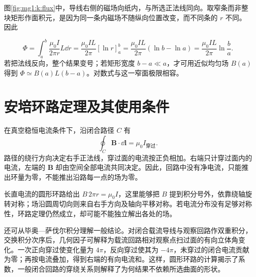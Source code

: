 图\ref{fig:mg1:k:flux}中，导线右侧的磁场向纸内，与所选正法线同向。取窄条而非整块矩形作面积元，是因为同一条内磁场不随纵向位置改变，而不同条的 $r$ 不同。因此

\[
 \Phi=\int_a^b\frac{\mu_0I}{2\pi r}L\dd r
 =\frac{\mu_0IL}{2\pi}[\ln r]_a^b
=\frac{\mu_0IL}{2\pi}(\ln b-\ln a)
=\frac{\mu_0IL}{2\pi}\ln\frac ba.
\]
若把法线反向，整个结果变号；若矩形宽度 $b-a\ll a$，才可用近似均匀场 $B(a)$ 得到 $\Phi\simeq B(a)L(b-a)$。对数式与这一窄面极限相容。



\section{安培环路定理及其使用条件}
在真空稳恒电流条件下，沿闭合路径 $C$ 有
\begin{equation}\oint_C\bm B\cdot\dd\bm l=\mu_0I_{\text{穿过}}.\end{equation}
路径的绕行方向决定右手正法线，穿过面的电流按正负相加。右端只计穿过面内的电流，左端的 $\bm B$ 却由空间全部电流共同决定。因此，回路中没有净电流，只能推出环量为零，不能推出沿路每一点的场为零。


长直电流的圆形环路给出 $B\,2\pi r=\mu_0I$，这里能够把 $B$ 提到积分号外，依靠绕轴旋转对称；场沿圆周切向则来自右手方向及轴向平移对称。若电流分布没有足够对称性，环路定理仍然成立，却可能不能独立解出各处的场。


还可从毕奥—萨伐尔积分理解一般结论。对闭合载流导线与观察回路作双重积分，交换积分次序后，几何因子可解释为载流回路相对观察点扫过面的有向立体角变化。一次正向穿过使变化量为 $4\pi$，反向穿过使其为 $-4\pi$，未穿过的闭合电流贡献为零；再按电流叠加，得到右端的有向电流和。这样，圆形环路的计算揭示了系数，一般闭合回路的穿绕关系则解释了为何结果不依赖所选曲面的形状。


